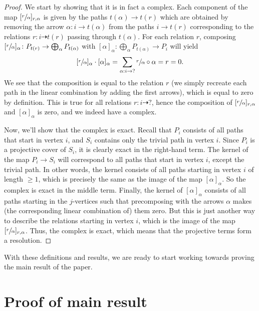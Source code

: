 \documentclass[12pt, dvipsnames, oneside]{amsart}
\theoremstyle{definition}
\begin{document}
\begin{proof}
We start by showing that it is in fact a complex. Each component of the map $[ \sfrac{r}{\alpha}]_{r,\alpha}$ is given by the paths $t(\alpha)\rightarrow t(r)$ which are obtained by removing the arrow $\alpha\colon i \rightarrow t(\alpha)$ from the paths $i\rightarrow t(r)$ corresponding to the relations $r\colon i\dashrightarrow t(r)$ passing through $t(\alpha)$. 
For each relation $r$, composing $[\sfrac{r}{\alpha}]_\alpha\colon P_{t(r)}\rightarrow \bigoplus_\alpha P_{t(\alpha)}$ with $[\alpha]_\alpha\colon \bigoplus_\alpha P_{t(\alpha)}\rightarrow P_i$ will yield
$$[\sfrac{r}{\alpha}]_\alpha\cdot[\alpha]_\alpha=\sum_{\alpha:i\rightarrow ?} \sfrac{r}{\alpha}\circ\alpha=r=0.$$
We see that the composition is equal to the relation $r$ (we simply recreate each path in the linear combination by adding the first arrows), which is equal to zero by definition. This is true for all relations $r\colon i\dashrightarrow ?$, hence the composition of $[\sfrac{r}{\alpha}]_{r,\alpha}$ and $[\alpha]_\alpha$ is zero, and we indeed have a complex.
\bigskip


Now, we'll show that the complex is exact. Recall that $P_i$ consists of all paths that start in vertex $i$, and $S_i$ contains only the trivial path in vertex $i$. Since $P_i$ is a projective cover of $S_i$, it is clearly exact in the right-hand term. The kernel of the map $P_i\rightarrow S_i$ will correspond to all paths that start in vertex $i$, except the trivial path. In other words, the kernel consists of all paths starting in vertex $i$ of length $\geq 1$, which is precisely the same as the image of the map $[\alpha]_\alpha$. So the complex is exact in the middle term. Finally, the kernel of $[\alpha]_\alpha$ consists of all paths starting in the $j$-vertices such that precomposing with the arrows $\alpha$ makes (the corresponding linear combination of) them zero. But this is just another way to describe the relations starting in vertex $i$, which is the image of the map $[\sfrac{r}{\alpha}]_{r,\alpha}$. Thus, the complex is exact, which means that the projective terms form a resolution. 
\end{proof}

With these definitions and results, we are ready to start working towards proving the main result of the paper.



\section{Proof of main result}
\end{document}

